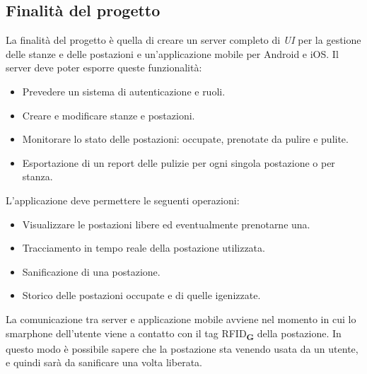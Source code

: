 \subsection{Finalità del progetto}
La finalità del progetto è quella di creare un server completo di \textit{UI} per la gestione delle stanze e delle postazioni e un'applicazione mobile per Android e iOS.
Il server deve poter esporre queste funzionalità:
\begin{itemize}
    \item Prevedere un sistema di autenticazione e ruoli.
    \item Creare e modificare stanze e postazioni.
    \item Monitorare lo stato delle postazioni: occupate, prenotate da pulire e pulite.
    \item Esportazione di un report delle pulizie per ogni singola postazione o per stanza.
\end{itemize}
L'applicazione deve permettere le seguenti operazioni:
\begin{itemize}
    \item Visualizzare le postazioni libere ed eventualmente prenotarne una.
    \item Tracciamento in tempo reale della postazione utilizzata.
    \item Sanificazione di una postazione.
    \item Storico delle postazioni occupate e di quelle igenizzate.
\end{itemize}
La comunicazione tra server e applicazione mobile avviene nel momento in cui lo smarphone dell'utente viene a contatto con il tag RFID\textsubscript{\textbf{G}} della postazione.
In questo modo è possibile sapere che la postazione sta venendo usata da un utente, e quindi sarà da sanificare una volta liberata.


